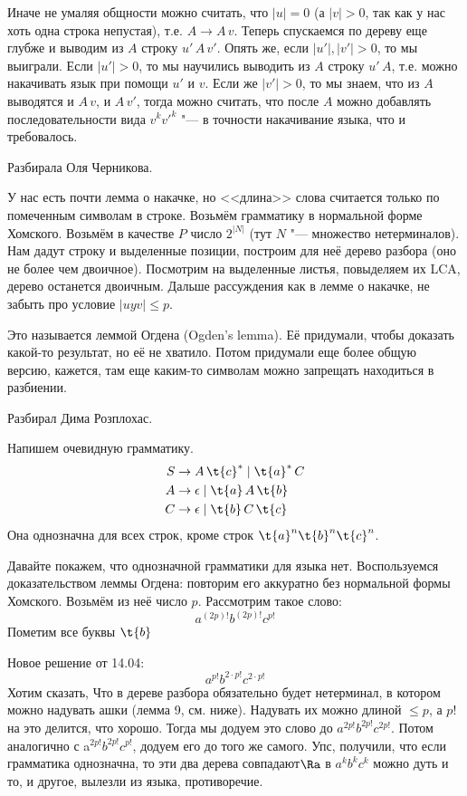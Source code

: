 	Иначе не умаляя общности можно считать, что $|u|=0$ (а $|v|>0$, так как у нас хоть одна
	строка непустая), т.е. $A \to A\, v$.
	Теперь спускаемся по дереву еще глубже и выводим из $A$ строку $u'\,A\,v'$.
	Опять же, если $|u'|, |v'|>0$, то мы выиграли.
	Если $|u'|>0$, то мы научились выводить из $A$ строку $u'\,A$,
	т.е. можно накачивать язык при помощи $u'$ и $v$.
	Если же $|v'|>0$, то мы знаем, что из $A$ выводятся и $A\,v$, и $A\,v'$,
	тогда можно считать, что после $A$ можно добавлять последовательности вида
	$v^k{v'}^k$ "--- в точности накачивание языка, что и требовалось.

	\TODO
	Разбирала Оля Черникова.

	У нас есть почти лемма о накачке, но <<длина>> слова считается только по помеченным символам в строке.
	Возьмём грамматику в нормальной форме Хомского.
	Возьмём в качестве $P$ число $2^{|N|}$ (тут $N$ "--- множество нетерминалов).
	Нам дадут строку и выделенные позиции, построим для неё дерево разбора (оно не более чем двоичное).
	Посмотрим на выделенные листья, повыделяем их LCA, дерево останется двоичным.
	\TODO Дальше рассуждения как в лемме о накачке, не забыть про условие $|uyv|\le p$.

	\begin{Rem}
		Это называется леммой Огдена (Ogden's lemma).
		Её придумали, чтобы доказать какой-то результат, но её не хватило.
		Потом придумали еще более общую версию, кажется, там еще каким-то символам можно запрещать находиться в разбиении.
	\end{Rem}

	\TODO
	Разбирал Дима Розплохас.

	Напишем очевидную грамматику.
	\begin{align*}
		S &\to A\,\t{c}^{*} \mid \t{a}^{*}\,C \\
		A &\to \epsilon \mid \t{a}\,A\,\t{b} \\
		C &\to \epsilon \mid \t{b}\,C\,\t{c} \\
	\end{align*}
	Она однозначна для всех строк, кроме строк $\t{a}^n\t{b}^n\t{c}^n$.

	Давайте покажем, что однозначной грамматики для языка нет.
	Воспользуемся доказательством леммы Огдена: повторим его аккуратно без нормальной формы Хомского.
	Возьмём из неё число $p$.
	Рассмотрим такое слово:
	\[ a^{(2p)!}b^{(2p)!}c^{p!} \]
	Пометим все буквы $\t{b}$
	\TODO

	Новое решение от 14.04:
	\[ a^{p!}b^{2\cdot p!}c^{2\cdot p!} \]
	Хотим сказать, Что в дереве разбора обязательно будет нетерминал, в котором можно надувать ашки (лемма 9, см. ниже).
	Надувать их можно длиной $\le p$, а $p!$ на это делится, что хорошо.
	Тогда мы додуем это слово до $a^{2p!} b^{2p!} c^{2p!}$.
	Потом аналогично с a$^{2p!}b^{2p!}c^{p!}$, додуем его до того же самого.
	Упс, получили, что если грамматика однозначна, то эти два дерева совпадают$\Ra$
	в $a^k b^k c^k$ можно дуть и то, и другое, вылезли из языка, противоречие.

